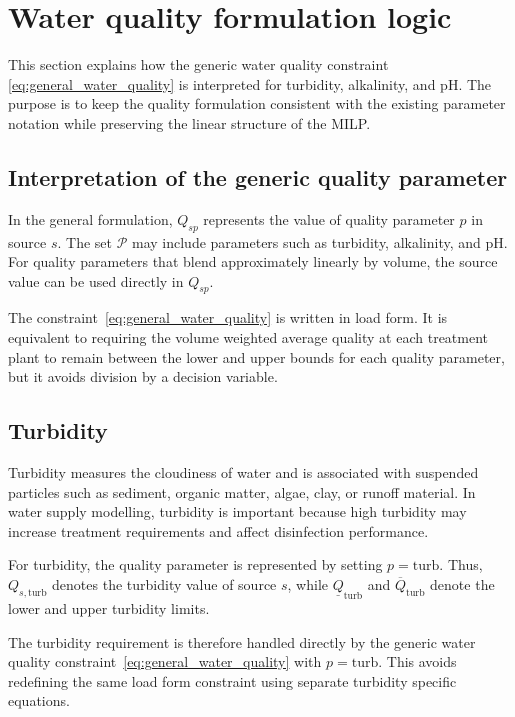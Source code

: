 \documentclass[10pt]{article}
\begin{document}
\section{Water quality formulation logic}

This section explains how the generic water quality constraint
\eqref{eq:general_water_quality} is interpreted for turbidity, alkalinity, and
$\mathrm{pH}$. The purpose is to keep the quality formulation consistent with
the existing parameter notation while preserving the linear structure of the
MILP.

\subsection{Interpretation of the generic quality parameter}

In the general formulation, $Q_{sp}$ represents the value of quality parameter
$p$ in source $s$. The set $\mathcal{P}$ may include parameters such as
turbidity, alkalinity, and $\mathrm{pH}$. For quality parameters that blend
approximately linearly by volume, the source value can be used directly in
$Q_{sp}$.

The constraint~\eqref{eq:general_water_quality} is written in load form. It is
equivalent to requiring the volume weighted average quality at each treatment
plant to remain between the lower and upper bounds for each quality parameter,
but it avoids division by a decision variable.

\subsection{Turbidity}

Turbidity measures the cloudiness of water and is associated with suspended
particles such as sediment, organic matter, algae, clay, or runoff material. In
water supply modelling, turbidity is important because high turbidity may
increase treatment requirements and affect disinfection performance.

For turbidity, the quality parameter is represented by setting
$p=\mathrm{turb}$. Thus, $Q_{s,\mathrm{turb}}$ denotes the turbidity value of
source $s$, while $\underline{Q}_{\mathrm{turb}}$ and
$\overline{Q}_{\mathrm{turb}}$ denote the lower and upper turbidity limits.

The turbidity requirement is therefore handled directly by the generic water
quality constraint~\eqref{eq:general_water_quality} with $p=\mathrm{turb}$.
This avoids redefining the same load form constraint using separate
turbidity specific equations.
\end{document}
